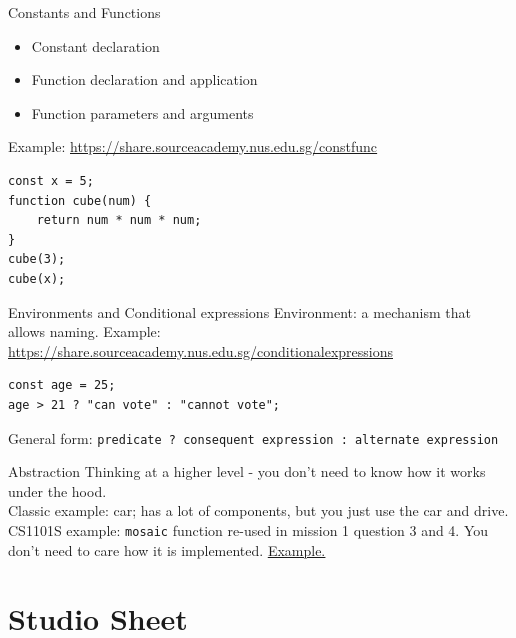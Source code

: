 \documentclass[10pt]{beamer}
\begin{document}
\begin{frame}[fragile]{Constants and Functions}
  \begin{itemize}
    \item Constant declaration
    \item Function declaration and application
    \item Function parameters and arguments \\
  \end{itemize}  
    Example: \href{https://share.sourceacademy.nus.edu.sg/constfunc}{\underline{https://share.sourceacademy.nus.edu.sg/constfunc}} \\
\begin{verbatim}
const x = 5;
function cube(num) {
    return num * num * num;
}
cube(3);
cube(x);
\end{verbatim}
\end{frame}

\begin{frame}[fragile]{Environments and Conditional expressions}
Environment: a mechanism that allows naming.
Example: \href{https://share.sourceacademy.nus.edu.sg/conditionalexpressions}{\underline{https://share.sourceacademy.nus.edu.sg/conditionalexpressions}} \\
\begin{verbatim}
const age = 25;
age > 21 ? "can vote" : "cannot vote";
\end{verbatim}
General form: \verb|predicate ? consequent expression : alternate expression|
\end{frame}

\begin{frame}[fragile]{Abstraction}
Thinking at a higher level - you don't need to know how it works under the hood. \\

Classic example: car; has a lot of components, but you just use the car and drive. \\

CS1101S example: \texttt{mosaic} function re-used in mission 1 question 3 and 4. You don't need to care how it is implemented. \href{https://share.sourceacademy.nus.edu.sg/abstraction}{\underline{Example.}}
\end{frame}

\section[Studio Sheet (and Photo Taking)]{Studio Sheet}
\end{document}
